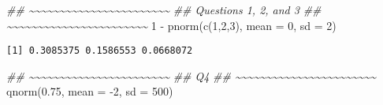 \documentclass[
  letterpaper,
  DIV=11,
  numbers=noendperiod]{scrreprt}
\newenvironment{Shaded}{\begin{snugshade}}{\end{snugshade}}
\newcommand{\AttributeTok}[1]{\textcolor[rgb]{0.40,0.45,0.13}{#1}}
\newcommand{\DecValTok}[1]{\textcolor[rgb]{0.68,0.00,0.00}{#1}}
\newcommand{\DocumentationTok}[1]{\textcolor[rgb]{0.37,0.37,0.37}{\textit{#1}}}
\newcommand{\FloatTok}[1]{\textcolor[rgb]{0.68,0.00,0.00}{#1}}
\newcommand{\FunctionTok}[1]{\textcolor[rgb]{0.28,0.35,0.67}{#1}}
\newcommand{\NormalTok}[1]{\textcolor[rgb]{0.00,0.23,0.31}{#1}}
\newcommand{\SpecialCharTok}[1]{\textcolor[rgb]{0.37,0.37,0.37}{#1}}
\begin{document}
\begin{Shaded}
\begin{Highlighting}[]
\DocumentationTok{\#\# \textasciitilde{}\textasciitilde{}\textasciitilde{}\textasciitilde{}\textasciitilde{}\textasciitilde{}\textasciitilde{}\textasciitilde{}\textasciitilde{}\textasciitilde{}\textasciitilde{}\textasciitilde{}\textasciitilde{}\textasciitilde{}\textasciitilde{}\textasciitilde{}\textasciitilde{}\textasciitilde{}\textasciitilde{}\textasciitilde{}\textasciitilde{}\textasciitilde{}\textasciitilde{}}
\DocumentationTok{\#\# Questions 1, 2, and 3}
\DocumentationTok{\#\# \textasciitilde{}\textasciitilde{}\textasciitilde{}\textasciitilde{}\textasciitilde{}\textasciitilde{}\textasciitilde{}\textasciitilde{}\textasciitilde{}\textasciitilde{}\textasciitilde{}\textasciitilde{}\textasciitilde{}\textasciitilde{}\textasciitilde{}\textasciitilde{}\textasciitilde{}\textasciitilde{}\textasciitilde{}\textasciitilde{}\textasciitilde{}\textasciitilde{}\textasciitilde{}}
\DecValTok{1} \SpecialCharTok{{-}} \FunctionTok{pnorm}\NormalTok{(}\FunctionTok{c}\NormalTok{(}\DecValTok{1}\NormalTok{,}\DecValTok{2}\NormalTok{,}\DecValTok{3}\NormalTok{), }\AttributeTok{mean =} \DecValTok{0}\NormalTok{, }\AttributeTok{sd =} \DecValTok{2}\NormalTok{)}
\end{Highlighting}
\end{Shaded}

\begin{verbatim}
[1] 0.3085375 0.1586553 0.0668072
\end{verbatim}

\begin{Shaded}
\begin{Highlighting}[]
\DocumentationTok{\#\# \textasciitilde{}\textasciitilde{}\textasciitilde{}\textasciitilde{}\textasciitilde{}\textasciitilde{}\textasciitilde{}\textasciitilde{}\textasciitilde{}\textasciitilde{}\textasciitilde{}\textasciitilde{}\textasciitilde{}\textasciitilde{}\textasciitilde{}\textasciitilde{}\textasciitilde{}\textasciitilde{}\textasciitilde{}\textasciitilde{}\textasciitilde{}\textasciitilde{}\textasciitilde{}}
\DocumentationTok{\#\# Q4}
\DocumentationTok{\#\# \textasciitilde{}\textasciitilde{}\textasciitilde{}\textasciitilde{}\textasciitilde{}\textasciitilde{}\textasciitilde{}\textasciitilde{}\textasciitilde{}\textasciitilde{}\textasciitilde{}\textasciitilde{}\textasciitilde{}\textasciitilde{}\textasciitilde{}\textasciitilde{}\textasciitilde{}\textasciitilde{}\textasciitilde{}\textasciitilde{}\textasciitilde{}\textasciitilde{}\textasciitilde{}}
\FunctionTok{qnorm}\NormalTok{(}\FloatTok{0.75}\NormalTok{, }\AttributeTok{mean =} \SpecialCharTok{{-}}\DecValTok{2}\NormalTok{, }\AttributeTok{sd =} \DecValTok{500}\NormalTok{)}
\end{Highlighting}
\end{Shaded}
\end{document}
